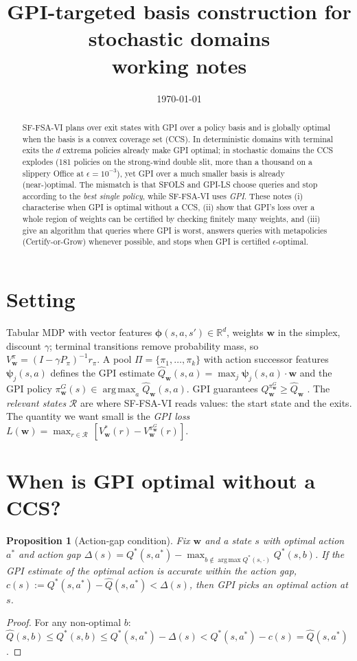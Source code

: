 \documentclass[11pt]{article}
\title{GPI-targeted basis construction for stochastic domains\\[2pt]
\large working notes}
\author{}
\date{\today}
\newcommand{\vphi}{\bm{\phi}}
\newcommand{\vpsi}{\bm{\psi}}
\newcommand{\w}{\mathbf{w}}
\DeclareMathOperator*{\argmax}{arg\,max}
\newtheorem{proposition}{Proposition}
\begin{document}
\maketitle

\begin{abstract}
SF-FSA-VI \cite{kuric} plans over exit states with GPI over a policy basis and is globally optimal when the
basis is a convex coverage set (CCS). In deterministic domains with terminal exits the $d$ extrema policies
already make GPI optimal; in stochastic domains the CCS explodes (181 policies on the strong-wind double
slit, more than a thousand on a slippery Office at $\epsilon=10^{-3}$), yet GPI over a much smaller basis is
already (near-)optimal. The mismatch is that SFOLS \cite{alegre22} and GPI-LS \cite{alegre23} choose
queries and stop according to the \emph{best single policy}, while SF-FSA-VI uses \emph{GPI}. These notes
(i) characterise when GPI is optimal without a CCS, (ii) show that GPI's loss over a whole region of
weights can be certified by checking finitely many weights, and (iii) give an algorithm that queries where
GPI is worst, answers queries with metapolicies (Certify-or-Grow) whenever possible, and stops when GPI is
certified $\epsilon$-optimal.
\end{abstract}

\section{Setting}
Tabular MDP with vector features $\vphi(s,a,s')\in\mathbb R^d$, weights $\w$ in the simplex, discount
$\gamma$; terminal transitions remove probability mass, so $V^\pi_\w=(I-\gamma P_\pi)^{-1}r_\pi$.
A pool $\Pi=\{\pi_1,\dots,\pi_k\}$ with action successor features $\vpsi_j(s,a)$ defines the GPI estimate
$\hat Q_\w(s,a)=\max_j \vpsi_j(s,a)\cdot\w$ and the GPI policy $\pi^{G}_\w(s)\in\argmax_a \hat Q_\w(s,a)$.
GPI guarantees $Q^{\pi^G_\w}_\w\ge \hat Q_\w$ \cite{barreto17}. The \emph{relevant states} $\mathcal R$ are
where SF-FSA-VI reads values: the start state and the exits.
The quantity we want small is the \emph{GPI loss} $L(\w)=\max_{r\in\mathcal R}\,[V^*_\w(r)-V^{\pi^G_\w}_\w(r)]$.

\section{When is GPI optimal without a CCS?}

\begin{proposition}[Action-gap condition]\label{prop:gap}
Fix $\w$ and a state $s$ with optimal action $a^*$ and action gap
$\Delta(s)=Q^*(s,a^*)-\max_{b\notin\argmax Q^*(s,\cdot)}Q^*(s,b)$. If the GPI estimate of the optimal
action is accurate within the action gap, $c(s):=Q^*(s,a^*)-\hat Q(s,a^*)<\Delta(s)$, then GPI picks an
optimal action at $s$.
\end{proposition}
\begin{proof}
For any non-optimal $b$: $\hat Q(s,b)\le Q^*(s,b)\le Q^*(s,a^*)-\Delta(s)<Q^*(s,a^*)-c(s)=\hat Q(s,a^*)$.
\end{proof}
\end{document}
